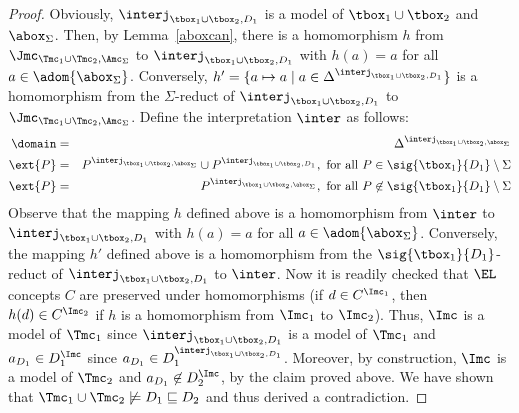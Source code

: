 \documentclass{lmcs}
\theoremstyle{definition}
\begin{document}
\begin{proof}
  Obviously, $\interj_{\tbox_{1}\cup\tbox_{2},D_{1}}$ is a model of 
  $\tbox_{1}\cup\tbox_{2}$ and $\abox_{\Sigma}$. Then, by 
  Lemma~\ref{aboxcan}, there is a homomorphism $h$ from 
  $\Jmc_{\Tmc_{1}\cup \Tmc_{2},\Amc_{\Sigma}}$ to 
  $\interj_{\tbox_{1}\cup\tbox_{2},D_{1}}$ with $h(a)=a$ for all 
  $a\in\adom{\abox_{\Sigma}}$. Conversely, $h'=\{a\mapsto a\mid 
  a\in\Delta^{\interj_{\tbox_{1}\cup\tbox_{2},D_{1}}}\}$ is a 
  homomorphism from the $\Sigma$-reduct of $\interj_{\tbox_{1}\cup\tbox_{2},D_{1}}$ 
  to $\Jmc_{\Tmc_{1}\cup \Tmc_{2},\Amc_{\Sigma}}$. Define the interpretation $\inter$ as follows:
  \begin{eqnarray*} 
    \domain & = & \Delta^{\interj_{\tbox_{1}\cup\tbox_{2},\abox_{\Sigma}}}\\
    \ext{P} & = & P^{\interj_{\tbox_{1}\cup\tbox_{2},\abox_{\Sigma}}}\cup 
      P^{\interj_{\tbox_{1}\cup\tbox_{2},D_{1}}}, \text{ for all $P\in\sig{\tbox_{1}}{D_{1}}\setminus\Sigma$}\\
    \ext{P}  & = & P^{\interj_{\tbox_{1}\cup\tbox_{2},\abox_{\Sigma}}}, \text{ for all $P\not\in \sig{\tbox_{1}}{D_{1}}\setminus\Sigma$}
 \end{eqnarray*}
  Observe that the mapping $h$ defined above is a homomorphism from $\inter$ to 
  $\interj_{\tbox_{1}\cup\tbox_{2},D_{1}}$ with $h(a)=a$ for all 
  $a\in\adom{\abox_{\Sigma}}$. Conversely, the mapping $h'$ defined above is a homomorphism from the $\sig{\tbox_{1}}{D_{1}}$-reduct of 
  $\interj_{\tbox_{1}\cup\tbox_{2},D_{1}}$ to $\inter$. Now it is readily checked that $\EL$ concepts $C$ are 
  preserved under homomorphisms (if $d\in C^{\Imc_{1}}$,
  then $h(d)\in C^{\Imc_{2}}$ if $h$ is a homomorphism from $\Imc_{1}$ to $\Imc_{2}$).
  Thus, $\Imc$ is a model of $\Tmc_{1}$ since $\interj_{\tbox_{1}\cup\tbox_{2},D_{1}}$ is a model of $\Tmc_{1}$ and 
  $a_{D_{1}}\in D_{1}^{\Imc}$ since $a_{D_{1}}\in D_{1}^{\interj_{\tbox_{1}\cup\tbox_{2},D_{1}}}$. Moreover, by construction, $\Imc$ is a model of $\Tmc_{2}$ and 
  $a_{D_{1}}\not\in D_{2}^{\Imc}$, by the claim proved above.
  We have shown that $\Tmc_{1}\cup \Tmc_{2}\not\models D_{1}\sqsubseteq D_{2}$ and thus derived a contradiction.
\end{proof}



\end{document}
